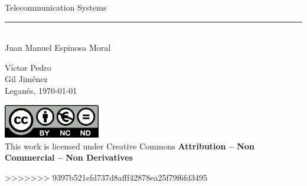 \documentclass[../main.tex]{subfiles}
\begin{document}
\begin{titlepage}
\begin{sffamily}
\begin{center}
		 	{\Huge Telecommunication Systems}\\
		 	\vspace*{0.5cm}
	 		\rule{10.5cm}{0.1mm}\\
			\vspace*{0.9cm}
			{\LARGE Juan Manuel Espinosa Moral}\\ 
			\vspace*{1cm}

		\begin{Large}
			Víctor Pedro\\
			Gil Jiménez\\
			Leganés, \today\\
		\end{Large}
	\end{center}

	\vfill

	\color{black}

	\includegraphics[width=4.2cm]{images/UC3M/creativecommons.png}\\
	This work is licensed under Creative Commons \textbf{Attribution – Non Commercial – Non Derivatives}

>>>>>>> 9397b521efd737d8afff42878ea25f79f6fd3495
	\end{sffamily}
\end{titlepage}
\end{document}
